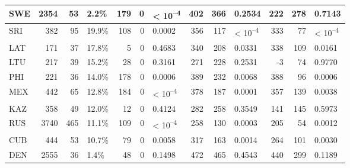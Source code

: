 \begin{tabular}{l|r|r|l|r|r|l|r|r|l|r|r|l}
\hline
SWE & 2354 & 53 & 2.2\% & 179 & 0 & < 10\textsuperscript{--4} & 402 & 366 & 0.2534 & 222 & 278 & 0.7143\\
\hline
SRI & 382 & 95 & 19.9\% & 108 & 0 & 0.0002 & 356 & 117 & < 10\textsuperscript{--4} & 333 & 77 & < 10\textsuperscript{--4}\\
\hline
LAT & 171 & 37 & 17.8\% & 5 & 0 & 0.4683 & 340 & 208 & 0.0331 & 338 & 109 & 0.0161\\
\hline
LTU & 217 & 39 & 15.2\% & 28 & 0 & 0.3161 & 271 & 228 & 0.2531 & -3 & 74 & 0.9770\\
\hline
PHI & 221 & 36 & 14.0\% & 178 & 0 & 0.0006 & 389 & 232 & 0.0068 & 388 & 96 & 0.0006\\
\hline
MEX & 442 & 65 & 12.8\% & 184 & 0 & < 10\textsuperscript{--4} & 378 & 187 & 0.0001 & 357 & 139 & 0.0038\\
\hline
KAZ & 358 & 49 & 12.0\% & 12 & 0 & 0.4124 & 282 & 258 & 0.3549 & 141 & 145 & 0.5973\\
\hline
RUS & 3740 & 465 & 11.1\% & 109 & 0 & < 10\textsuperscript{--4} & 258 & 130 & 0.0003 & 205 & 54 & 0.0012\\
\hline
CUB & 444 & 53 & 10.7\% & 79 & 0 & 0.0058 & 317 & 163 & 0.0014 & 264 & 101 & 0.0030\\
\hline
DEN & 2555 & 36 & 1.4\% & 48 & 0 & 0.1498 & 472 & 465 & 0.4543 & 440 & 299 & 0.1189\\
\hline
\end{tabular}
